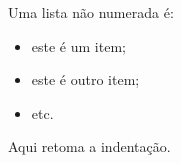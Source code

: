 Uma lista não numerada é:
\begin{itemize}
 \item este é um item;
 \item este é outro item;
 \item etc.
\end{itemize}
Aqui retoma a indentação.
